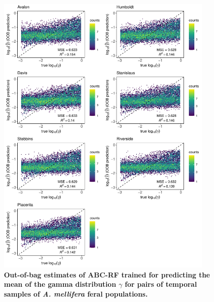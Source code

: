 \documentclass[a4paper, 12pt]{article}
\begin{document}
\begin{figure}[ht]
 \centering
 \includegraphics[width=0.95\textwidth]{Figures/FigureS20_combined_plot_gamma.pdf}
 \small\caption{\textbf{Out-of-bag estimates of ABC-RF trained for predicting the mean of the gamma distribution $\gamma$ for pairs of temporal samples of \textit{A. mellifera} feral populations.}}
 \label{fig:supple_feralbee_gammamean}
\end{figure}
\end{document}
